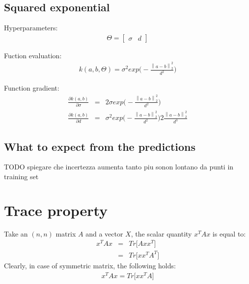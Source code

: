 \documentclass{article}
\begin{document}
\subsection{Squared exponential}

Hyperparameters:
\begin{eqnarray}
\Theta = \begin{bmatrix} \sigma & d \end{bmatrix}
\end{eqnarray}

Fuction evaluation:
\begin{eqnarray}
k(a,b,\Theta) =
\sigma^2 exp \bigg ( - \frac{\left \| a - b \right \| ^2_2}{d^2}  \bigg ) 
\end{eqnarray}

Function gradient:
\begin{eqnarray}
\frac{\partial k (a,b)}{\partial \sigma} &=& 2 \sigma exp \bigg ( - \frac{\left \| a - b \right \| ^2_2}{d^2}  \bigg ) \\
\frac{\partial k (a,b)}{\partial d} &=& \sigma^2 exp \bigg ( - \frac{\left \| a - b \right \| ^2_2}{d^2}  \bigg )
2 \frac{\left \| a - b \right \| ^2_2}{d^3}
\end{eqnarray}

\subsection{What to expect from the predictions}

TODO spiegare che incertezza aumenta tanto piu sonon lontano da punti in training set

\appendix

\section{Trace property}
\label{sec:trace_property}

Take an $(n,n)$ matrix $A$ and a vector $X$, the scalar quantity $x^T A x$ is equal to:
\begin{eqnarray}
x^T A x &=& Tr \bigg [ 
A xx^T
\bigg ]
\label{eq:Tr_property}
\\
&=& Tr \bigg [ 
xx^T A^T
\bigg ]
\end{eqnarray}
Clearly, in case of symmetric matrix, the following holds:
\begin{eqnarray}
x^T A x = Tr \bigg [ 
xx^T A
\bigg ]
\end{eqnarray}
\end{document}
